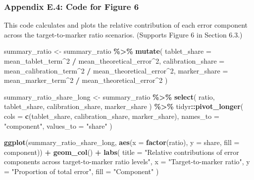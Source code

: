 \documentclass[
  12pt,
]{article}
\newenvironment{Shaded}{\begin{snugshade}}{\end{snugshade}}
\newcommand{\AttributeTok}[1]{\textcolor[rgb]{0.13,0.29,0.53}{#1}}
\newcommand{\DecValTok}[1]{\textcolor[rgb]{0.00,0.00,0.81}{#1}}
\newcommand{\FunctionTok}[1]{\textcolor[rgb]{0.13,0.29,0.53}{\textbf{#1}}}
\newcommand{\NormalTok}[1]{#1}
\newcommand{\OtherTok}[1]{\textcolor[rgb]{0.56,0.35,0.01}{#1}}
\newcommand{\SpecialCharTok}[1]{\textcolor[rgb]{0.81,0.36,0.00}{\textbf{#1}}}
\newcommand{\StringTok}[1]{\textcolor[rgb]{0.31,0.60,0.02}{#1}}
\begin{document}
\subsubsection{Appendix E.4: Code for Figure
6}\label{appendix-e.4-code-for-figure-6}

This code calculates and plots the relative contribution of each error
component across the target-to-marker ratio scenarios. (Supports Figure
6 in Section 6.3.)

\begin{Shaded}
\begin{Highlighting}[]
\NormalTok{summary\_ratio }\OtherTok{\textless{}{-}}\NormalTok{ summary\_ratio }\SpecialCharTok{\%\textgreater{}\%}
  \FunctionTok{mutate}\NormalTok{(}
    \AttributeTok{tablet\_share =}\NormalTok{ mean\_tablet\_term}\SpecialCharTok{\^{}}\DecValTok{2} \SpecialCharTok{/}\NormalTok{ mean\_theoretical\_error}\SpecialCharTok{\^{}}\DecValTok{2}\NormalTok{,}
    \AttributeTok{calibration\_share =}\NormalTok{ mean\_calibration\_term}\SpecialCharTok{\^{}}\DecValTok{2} \SpecialCharTok{/}\NormalTok{ mean\_theoretical\_error}\SpecialCharTok{\^{}}\DecValTok{2}\NormalTok{,}
    \AttributeTok{marker\_share =}\NormalTok{ mean\_marker\_term}\SpecialCharTok{\^{}}\DecValTok{2} \SpecialCharTok{/}\NormalTok{ mean\_theoretical\_error}\SpecialCharTok{\^{}}\DecValTok{2}
\NormalTok{  )}

\NormalTok{summary\_ratio\_share\_long }\OtherTok{\textless{}{-}}\NormalTok{ summary\_ratio }\SpecialCharTok{\%\textgreater{}\%}
  \FunctionTok{select}\NormalTok{(}
\NormalTok{    ratio,}
\NormalTok{    tablet\_share,}
\NormalTok{    calibration\_share,}
\NormalTok{    marker\_share}
\NormalTok{  ) }\SpecialCharTok{\%\textgreater{}\%}
\NormalTok{  tidyr}\SpecialCharTok{::}\FunctionTok{pivot\_longer}\NormalTok{(}
    \AttributeTok{cols =} \FunctionTok{c}\NormalTok{(tablet\_share, calibration\_share, marker\_share),}
    \AttributeTok{names\_to =} \StringTok{"component"}\NormalTok{,}
    \AttributeTok{values\_to =} \StringTok{"share"}
\NormalTok{  )}

\FunctionTok{ggplot}\NormalTok{(summary\_ratio\_share\_long, }\FunctionTok{aes}\NormalTok{(}\AttributeTok{x =} \FunctionTok{factor}\NormalTok{(ratio), }\AttributeTok{y =}\NormalTok{ share, }\AttributeTok{fill =}\NormalTok{ component)) }\SpecialCharTok{+}
  \FunctionTok{geom\_col}\NormalTok{() }\SpecialCharTok{+}
  \FunctionTok{labs}\NormalTok{(}
    \AttributeTok{title =} \StringTok{"Relative contributions of error components }
\StringTok{    across  target{-}to{-}marker ratio levels"}\NormalTok{,}
    \AttributeTok{x =} \StringTok{"Target{-}to{-}marker ratio"}\NormalTok{,}
    \AttributeTok{y =} \StringTok{"Proportion of total error"}\NormalTok{,}
    \AttributeTok{fill =} \StringTok{"Component"}
\NormalTok{  )}
\end{Highlighting}
\end{Shaded}
\end{document}
